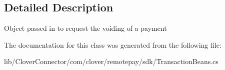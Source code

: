 \subsection{Detailed Description}
Object passed in to request the voiding of a payment 



The documentation for this class was generated from the following file\+:\begin{DoxyCompactItemize}
\item 
lib/\+Clover\+Connector/com/clover/remotepay/sdk/Transaction\+Beans.\+cs\end{DoxyCompactItemize}
